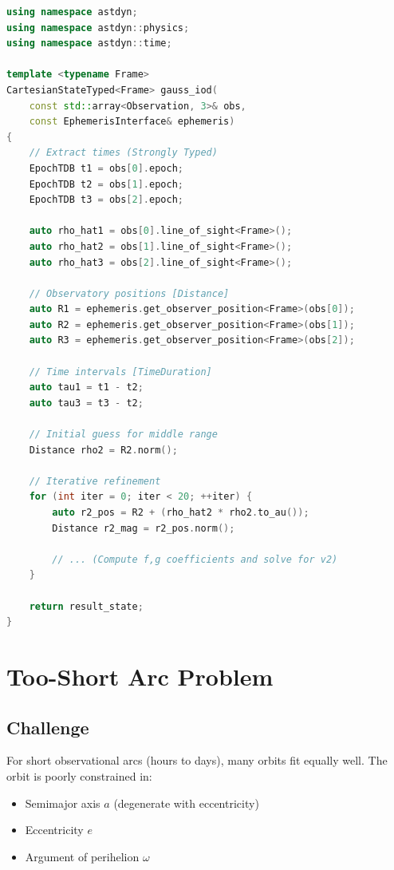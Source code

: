 \begin{lstlisting}[language=C++,caption={Gauss method implementation}]
using namespace astdyn;
using namespace astdyn::physics;
using namespace astdyn::time;

template <typename Frame>
CartesianStateTyped<Frame> gauss_iod(
    const std::array<Observation, 3>& obs,
    const EphemerisInterface& ephemeris)
{
    // Extract times (Strongly Typed)
    EpochTDB t1 = obs[0].epoch;
    EpochTDB t2 = obs[1].epoch;
    EpochTDB t3 = obs[2].epoch;
    
    auto rho_hat1 = obs[0].line_of_sight<Frame>();
    auto rho_hat2 = obs[1].line_of_sight<Frame>();
    auto rho_hat3 = obs[2].line_of_sight<Frame>();
    
    // Observatory positions [Distance]
    auto R1 = ephemeris.get_observer_position<Frame>(obs[0]);
    auto R2 = ephemeris.get_observer_position<Frame>(obs[1]);
    auto R3 = ephemeris.get_observer_position<Frame>(obs[2]);
    
    // Time intervals [TimeDuration]
    auto tau1 = t1 - t2;
    auto tau3 = t3 - t2;
    
    // Initial guess for middle range
    Distance rho2 = R2.norm();
    
    // Iterative refinement
    for (int iter = 0; iter < 20; ++iter) {
        auto r2_pos = R2 + (rho_hat2 * rho2.to_au()); 
        Distance r2_mag = r2_pos.norm();
        
        // ... (Compute f,g coefficients and solve for v2)
    }
    
    return result_state;
}
\end{lstlisting}

\section{Too-Short Arc Problem}

\subsection{Challenge}

For short observational arcs (hours to days), many orbits fit equally well. The orbit is poorly constrained in:
\begin{itemize}
    \item Semimajor axis $a$ (degenerate with eccentricity)
    \item Eccentricity $e$
    \item Argument of perihelion $\omega$
\end{itemize}

